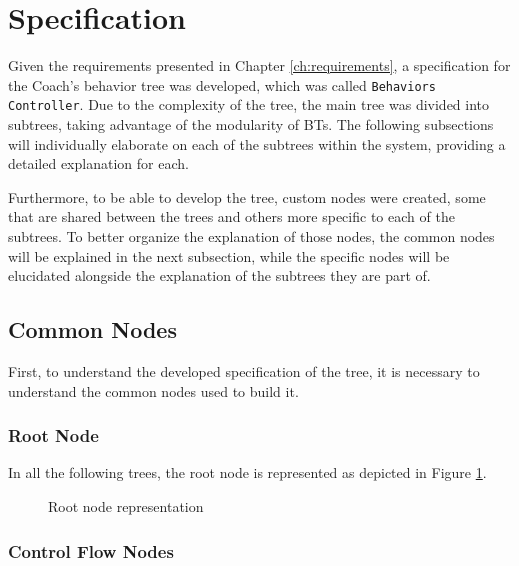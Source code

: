 \section{Specification}
\label{sec:specification}

Given the requirements presented in Chapter \ref{ch:requirements}, a specification for the Coach's behavior tree was developed, which was called \texttt{Behaviors Controller}. Due to the complexity of the tree, the main tree was divided into subtrees, taking advantage of the modularity of BTs. The following subsections will individually elaborate on each of the subtrees within the system, providing a detailed explanation for each. 

Furthermore, to be able to develop the tree, custom nodes were created, some that are shared between the trees and others more specific to each of the subtrees. To better organize the explanation of those nodes, the common nodes will be explained in the next subsection, while the specific nodes will be elucidated alongside the explanation of the subtrees they are part of.

\subsection{Common Nodes}
\label{subsec:common_nodes_spec}

First, to understand the developed specification of the tree, it is necessary to understand the common nodes used to build it.

\subsubsection{Root Node}

In all the following trees, the root node is represented as depicted in Figure \ref{fig:root_node_spec}.

\begin{figure}[!h]
    \centering
    \begin{forest}
    \end{forest}
    \caption{Root node representation}
    \label{fig:root_node_spec}
\end{figure}

\subsubsection{Control Flow Nodes}
\label{subsubsec:control_nodes_spec}

